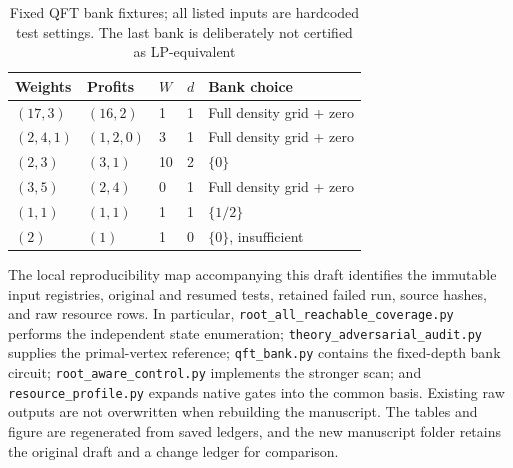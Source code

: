 \documentclass[referee,pdflatex,sn-mathphys-num]{sn-jnl}
\theoremstyle{thmstyleone}
\theoremstyle{thmstyletwo}
\begin{document}
\begin{table}[t]
\caption{Fixed QFT bank fixtures; all listed inputs are hardcoded test settings. The last bank is deliberately not certified as LP-equivalent}\label{tab:fixtures}
\centering\small
\begin{tabular}{lllll}
\toprule
Weights & Profits & $W$ & $d$ & Bank choice\\
\midrule
$(17,3)$ & $(16,2)$ & 1 & 1 & Full density grid + zero\\
$(2,4,1)$ & $(1,2,0)$ & 3 & 1 & Full density grid + zero\\
$(2,3)$ & $(3,1)$ & 10 & 2 & $\{0\}$\\
$(3,5)$ & $(2,4)$ & 0 & 1 & Full density grid + zero\\
$(1,1)$ & $(1,1)$ & 1 & 1 & $\{1/2\}$\\
$(2)$ & $(1)$ & 1 & 0 & $\{0\}$, insufficient\\
\bottomrule
\end{tabular}
\end{table}

The local reproducibility map accompanying this draft identifies the immutable input registries, original and resumed tests, retained failed run, source hashes, and raw resource rows. In particular, \texttt{root\_all\_reachable\_coverage.py} performs the independent state enumeration; \texttt{theory\_adversarial\_audit.py} supplies the primal-vertex reference; \texttt{qft\_bank.py} contains the fixed-depth bank circuit; \texttt{root\_aware\_control.py} implements the stronger scan; and \texttt{resource\_profile.py} expands native gates into the common basis. Existing raw outputs are not overwritten when rebuilding the manuscript. The tables and figure are regenerated from saved ledgers, and the new manuscript folder retains the original draft and a change ledger for comparison.


\end{document}
